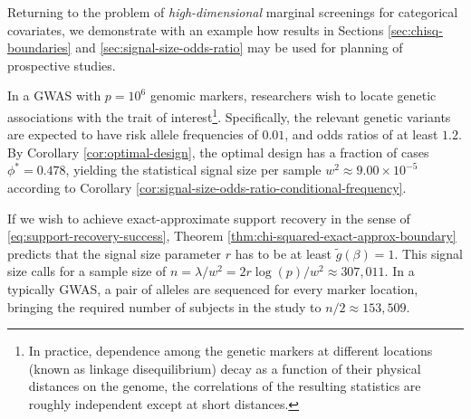 Returning to the problem of \emph{high-dimensional} marginal screenings for categorical covariates, we demonstrate with an example how results in Sections \ref{sec:chisq-boundaries} and \ref{sec:signal-size-odds-ratio} may be used for planning of prospective studies.

\begin{example}
In a GWAS with $p = 10^6$ genomic markers, researchers wish to locate genetic associations with the trait of interest\footnote{In practice, dependence among the genetic markers at different locations (known as linkage disequilibrium) decay as a function of their physical distances on the genome, the correlations of the resulting statistics are roughly independent except at short distances.}.
Specifically, the relevant genetic variants are expected to have risk allele frequencies of $0.01$, and odds ratios of at least $1.2$.
By Corollary \ref{cor:optimal-design}, the optimal design has a fraction of cases $\phi^* = 0.478$, yielding the statistical signal size per sample $w^2\approx9.00\times10^{-5}$ according to Corollary \ref{cor:signal-size-odds-ratio-conditional-frequency}.

If we wish to achieve exact-approximate support recovery in the sense of \eqref{eq:support-recovery-success}, Theorem \ref{thm:chi-squared-exact-approx-boundary} predicts that the signal size parameter $r$ has to be at least $\widetilde{g}(\beta)= 1$.
This signal size calls for a sample size of $n = \lambda / w^2 = 2r\log(p)/w^2 \approx 307,011$.
In a typically GWAS, a pair of alleles are sequenced for every marker location, bringing the required number of subjects in the study to $n/2 \approx 153,509$.
\end{example}


